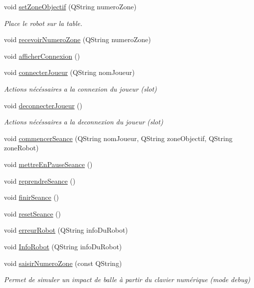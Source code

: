 \begin{DoxyCompactItemize}
void \hyperlink{class_ttpa_ihm_a3fd5b5d097f8a52df6fc8dd6d59b1374}{set\+Zone\+Objectif} (Q\+String numero\+Zone)
\begin{DoxyCompactList}\small\item\em Place le robot sur la table. \end{DoxyCompactList}\item 
void \hyperlink{class_ttpa_ihm_a0070bf0027c8a903e5bb5a543533e82c}{recevoir\+Numero\+Zone} (Q\+String numero\+Zone)
\item 
void \hyperlink{class_ttpa_ihm_a0ad70018b8aff04ef55a258dfc78ec04}{afficher\+Connexion} ()
\item 
void \hyperlink{class_ttpa_ihm_a3b3eaf479e616df033680a4df42da3d7}{connecter\+Joueur} (Q\+String nom\+Joueur)
\begin{DoxyCompactList}\small\item\em Actions nécéssaires a la connexion du joueur (slot) \end{DoxyCompactList}\item 
void \hyperlink{class_ttpa_ihm_a86d400f2f250f5d2984c8c36394c2ac2}{deconnecter\+Joueur} ()
\begin{DoxyCompactList}\small\item\em Actions nécéssaires a la deconnexion du joueur (slot) \end{DoxyCompactList}\item 
void \hyperlink{class_ttpa_ihm_a9bf7a4cddbdbf786d781e4d084409068}{commencer\+Seance} (Q\+String nom\+Joueur, Q\+String zone\+Objectif, Q\+String zone\+Robot)
\item 
void \hyperlink{class_ttpa_ihm_a4888ff555295f4e90e0d42bd87ad2d92}{mettre\+En\+Pause\+Seance} ()
\item 
void \hyperlink{class_ttpa_ihm_acf4cf42c5d1481ccda7ae12bace0a6d5}{reprendre\+Seance} ()
\item 
void \hyperlink{class_ttpa_ihm_aec3a96864aaa87f245bdafbf7a076a94}{finir\+Seance} ()
\item 
void \hyperlink{class_ttpa_ihm_a521fea1cb4384157e5422a033e9a4d4f}{reset\+Seance} ()
\item 
void \hyperlink{class_ttpa_ihm_a3a2380e2259f7b5bb1fd4d2ae470e06d}{erreur\+Robot} (Q\+String info\+Du\+Robot)
\item 
void \hyperlink{class_ttpa_ihm_a1101f9766b4e90844576c1d6b7e2ea23}{Info\+Robot} (Q\+String info\+Du\+Robot)
\item 
void \hyperlink{class_ttpa_ihm_a9b22616e3a4e52ad2ecfe1818d5fadb2}{saisir\+Numero\+Zone} (const Q\+String)
\begin{DoxyCompactList}\small\item\em Permet de simuler un impact de balle à partir du clavier numérique (mode debug) \end{DoxyCompactList}\item 

\end{DoxyCompactItemize}
